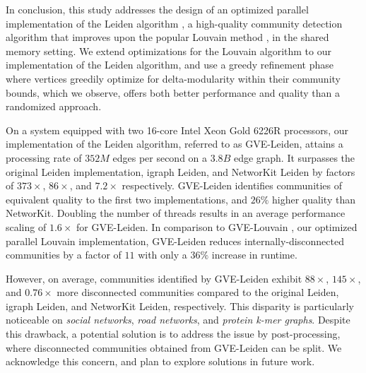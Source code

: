 In conclusion, this study addresses the design of an optimized parallel implementation of the Leiden algorithm \cite{com-traag19}, a high-quality community detection algorithm that improves upon the popular Louvain method \cite{com-blondel08}, in the shared memory setting. We extend optimizations for the Louvain algorithm \cite{sahu2023gvelouvain} to our implementation of the Leiden algorithm, and use a greedy refinement phase where vertices greedily optimize for delta-modularity within their community bounds, which we observe, offers both better performance and quality than a randomized approach.

On a system equipped with two 16-core Intel Xeon Gold 6226R processors, our implementation of the Leiden algorithm, referred to as GVE-Leiden, attains a processing rate of $352 M$ edges per second on a $3.8 B$ edge graph. It surpasses the original Leiden implementation, igraph Leiden, and NetworKit Leiden by factors of $373\times$, $86\times$, and $7.2\times$ respectively. GVE-Leiden identifies communities of equivalent quality to the first two implementations, and $26\%$ higher quality than NetworKit. Doubling the number of threads results in an average performance scaling of $1.6\times$ for GVE-Leiden. In comparison to GVE-Louvain \cite{sahu2023gvelouvain}, our optimized parallel Louvain implementation, GVE-Leiden reduces internally-disconnected communities by a factor of $11$ with only a $36\%$ increase in runtime.

However, on average, communities identified by GVE-Leiden exhibit $88\times$, $145\times$, and $0.76\times$ more disconnected communities compared to the original Leiden, igraph Leiden, and NetworKit Leiden, respectively. This disparity is particularly noticeable on \textit{social networks}, \textit{road networks}, and \textit{protein k-mer graphs}. Despite this drawback, a potential solution is to address the issue by post-processing, where disconnected communities obtained from GVE-Leiden can be split. We acknowledge this concern, and plan to explore solutions in future work.
